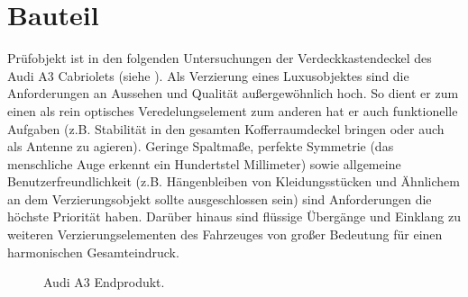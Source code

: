 \documentclass[12pt,a4paper,parskip]{scrartcl}
\begin{document}
  
\newpage
\section{Bauteil}
Prüfobjekt ist in den folgenden Untersuchungen der Verdeckkastendeckel  des Audi A3 Cabriolets (siehe ).
 Als Verzierung eines Luxusobjektes sind die Anforderungen an Aussehen und Qualität außergewöhnlich hoch. So dient er zum einen als rein optisches Veredelungselement zum anderen hat er auch funktionelle Aufgaben (z.B. Stabilität in den gesamten Kofferraumdeckel bringen oder auch als Antenne zu agieren). Geringe Spaltmaße,  perfekte Symmetrie (das menschliche Auge erkennt ein Hundertstel Millimeter) sowie allgemeine Benutzerfreundlichkeit (z.B. Hängenbleiben von Kleidungsstücken und Ähnlichem an dem Verzierungsobjekt sollte ausgeschlossen sein) sind Anforderungen die höchste Priorität haben.
 Darüber hinaus sind  flüssige Übergänge und Einklang   zu weiteren Verzierungselementen des Fahrzeuges von großer Bedeutung für einen harmonischen Gesamteindruck.
 
   
\begin{figure}[hbtp]
\centering
\hfill
{}
\hfill
{}
\hfill
\caption[Audi A3 Endprodukt]{Audi A3 Endprodukt.\footnotemark }
\label{fig:audia3}
\end{figure}
\end{document}
